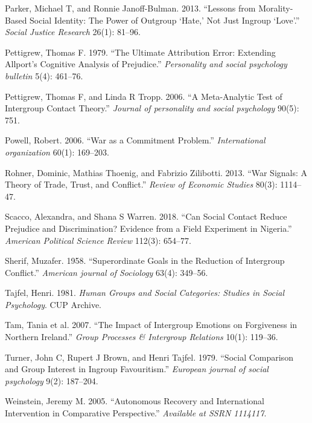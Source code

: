 \documentclass[11pt]{article}
\begin{document}
\leavevmode\hypertarget{ref-parker2013lessons}{}%
Parker, Michael T, and Ronnie Janoff-Bulman. 2013. ``Lessons from
Morality-Based Social Identity: The Power of Outgroup `Hate,' Not Just
Ingroup `Love'.'' \emph{Social Justice Research} 26(1): 81--96.

\leavevmode\hypertarget{ref-pettigrew1979ultimate}{}%
Pettigrew, Thomas F. 1979. ``The Ultimate Attribution Error: Extending
Allport's Cognitive Analysis of Prejudice.'' \emph{Personality and
social psychology bulletin} 5(4): 461--76.

\leavevmode\hypertarget{ref-pettigrew2006meta}{}%
Pettigrew, Thomas F, and Linda R Tropp. 2006. ``A Meta-Analytic Test of
Intergroup Contact Theory.'' \emph{Journal of personality and social
psychology} 90(5): 751.

\leavevmode\hypertarget{ref-powell2006war}{}%
Powell, Robert. 2006. ``War as a Commitment Problem.''
\emph{International organization} 60(1): 169--203.

\leavevmode\hypertarget{ref-rohner2013war}{}%
Rohner, Dominic, Mathias Thoenig, and Fabrizio Zilibotti. 2013. ``War
Signals: A Theory of Trade, Trust, and Conflict.'' \emph{Review of
Economic Studies} 80(3): 1114--47.

\leavevmode\hypertarget{ref-scacco2018nigeria}{}%
Scacco, Alexandra, and Shana S Warren. 2018. ``Can Social Contact Reduce
Prejudice and Discrimination? Evidence from a Field Experiment in
Nigeria.'' \emph{American Political Science Review} 112(3): 654--77.

\leavevmode\hypertarget{ref-sherif1958superordinate}{}%
Sherif, Muzafer. 1958. ``Superordinate Goals in the Reduction of
Intergroup Conflict.'' \emph{American journal of Sociology} 63(4):
349--56.

\leavevmode\hypertarget{ref-tajfel1981groups}{}%
Tajfel, Henri. 1981. \emph{Human Groups and Social Categories: Studies
in Social Psychology}. CUP Archive.

\leavevmode\hypertarget{ref-tam2007impact}{}%
Tam, Tania et al. 2007. ``The Impact of Intergroup Emotions on
Forgiveness in Northern Ireland.'' \emph{Group Processes \& Intergroup
Relations} 10(1): 119--36.

\leavevmode\hypertarget{ref-turner1979social}{}%
Turner, John C, Rupert J Brown, and Henri Tajfel. 1979. ``Social
Comparison and Group Interest in Ingroup Favouritism.'' \emph{European
journal of social psychology} 9(2): 187--204.

\leavevmode\hypertarget{ref-weinstein2005autonomous}{}%
Weinstein, Jeremy M. 2005. ``Autonomous Recovery and International
Intervention in Comparative Perspective.'' \emph{Available at SSRN
1114117}.
\end{document}
